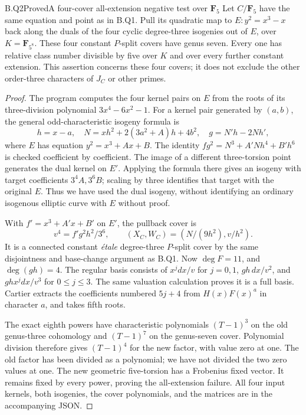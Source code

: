 \begin{claim}{B.Q2}{Proved}{A four-cover all-extension negative test over \(\mathbf F_5\)}
Let $C/\mathbf F_5$ have the same equation and point as in B.Q1.
Pull its quadratic map to $E:y^2=x^3-x$ back along the duals
of the four cyclic degree-three isogenies out of $E$, over
$K=\mathbf F_{5^8}$. These four constant $P$-split covers
have genus seven. Every one has relative class number divisible
by five over $K$ and over every further constant extension.
This assertion concerns these four covers; it does not exclude
the other order-three characters of $J_C$ or other primes.
\end{claim}
\begin{proof}
The program  computes the four
kernel pairs on $E$ from the roots of its three-division
polynomial $3x^4-6x^2-1$. For a kernel pair generated by
$(a,b)$, the general odd-characteristic isogeny formula is
\[
 h=x-a,\quad N=xh^2+2(3a^2+A)h+4b^2,
 \quad g=N'h-2Nh',
\]
where $E$ has equation $y^2=x^3+Ax+B$. The identity
$fg^2=N^3+A'Nh^4+B'h^6$ is checked coefficient by
coefficient. The image of a different three-torsion point
generates the dual kernel on $E'$. Applying the formula there
gives an isogeny with target coefficients $3^4A,3^6B$;
scaling by three identifies that target with the original $E$.
Thus we have used the dual isogeny, without identifying an
ordinary isogenous elliptic curve with $E$ without proof.

With $f'=x^3+A'x+B'$ on $E'$, the pullback cover is
\[
        v^4=f'g^2h^2/3^6,
        \qquad (X_C,W_C)=(N/(9h^2),v/h^2).
\]
It is a connected constant \emph{\'etale} degree-three
$P$-split cover by the same disjointness and base-change
argument as B.Q1. Now $\deg F=11$, and $\deg(gh)=4$.
The regular basis consists of $x^jdx/v$ for $j=0,1$,
$gh\,dx/v^2$, and $ghx^jdx/v^3$ for $0\le j\le3$.
The same valuation calculation proves it is a full basis.
Cartier extracts the coefficients numbered $5j+4$ from
$H(x)F(x)^a$ in character $a$, and takes fifth roots.

The exact eighth powers have characteristic polynomials
$(T-1)^3$ on the old genus-three cohomology and
$(T-1)^7$ on the genus-seven cover. Polynomial division
therefore gives $(T-1)^4$ for the new factor, with value
zero at one. The old factor has been divided as a polynomial;
we have not divided the two zero values at one.
The new geometric five-torsion has a Frobenius fixed vector.
It remains fixed by every power, proving the all-extension
failure. All four input kernels, both isogenies, the cover
polynomials, and the matrices are in the accompanying JSON.
\end{proof}

